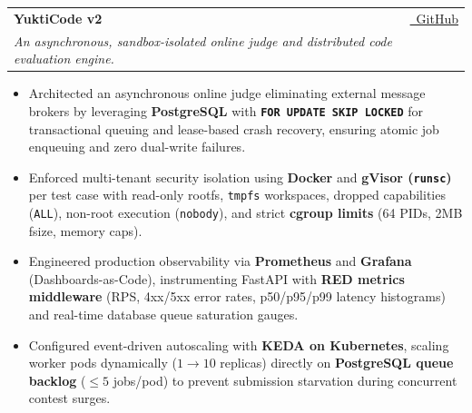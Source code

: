 \documentclass[a4paper,11pt]{article}
\makeatletter
\newcommand{\resumeProject}[4]{
\vspace{0.3mm}\item
    \begin{tabular*}{0.98\textwidth}[t]{l@{\extracolsep{\fill}}r}
        \textbf{#1} & \footnotesize{#3} \\[-0.8mm]
        \footnotesize{\textit{#2}} & \footnotesize{#4}
    \end{tabular*}
    \vspace{-1.5mm}
}
\newcommand{\resumeItemListStart}{\begin{justify}\begin{itemize}[leftmargin=3ex, rightmargin=2ex, noitemsep,labelsep=1.2mm,itemsep=0mm]\small}
\newcommand{\resumeItemListEnd}{\end{itemize}\end{justify}\vspace{-1.5mm}}
\makeatother
\begin{document}
    \resumeProject
      {YuktiCode v2} %
      {An asynchronous, sandbox-isolated online judge and distributed code evaluation engine.} %
      {\href{https://github.com/singhvi28/yukticode-v2}{\faGithub\ GitHub}} %
      {} 
    \vspace{-1.7mm}
      \resumeItemListStart
        \item {Architected an asynchronous online judge eliminating external message brokers by leveraging \textbf{PostgreSQL} with \textbf{\texttt{FOR UPDATE SKIP LOCKED}} for transactional queuing and lease-based crash recovery, ensuring atomic job enqueuing and zero dual-write failures.}
        \item {Enforced multi-tenant security isolation using \textbf{Docker} and \textbf{gVisor (\texttt{runsc})} per test case with read-only rootfs, \texttt{tmpfs} workspaces, dropped capabilities (\texttt{ALL}), non-root execution (\texttt{nobody}), and strict \textbf{cgroup limits} (64 PIDs, 2MB fsize, memory caps).}
        \item {Engineered production observability via \textbf{Prometheus} and \textbf{Grafana} (Dashboards-as-Code), instrumenting FastAPI with \textbf{RED metrics middleware} (RPS, 4xx/5xx error rates, p50/p95/p99 latency histograms) and real-time database queue saturation gauges.}
        \item {Configured event-driven autoscaling with \textbf{KEDA on Kubernetes}, scaling worker pods dynamically ($1\to 10$ replicas) directly on \textbf{PostgreSQL queue backlog} ($\le 5$ jobs/pod) to prevent submission starvation during concurrent contest surges.}
      \resumeItemListEnd
    \vspace{-2mm}
\end{document}
